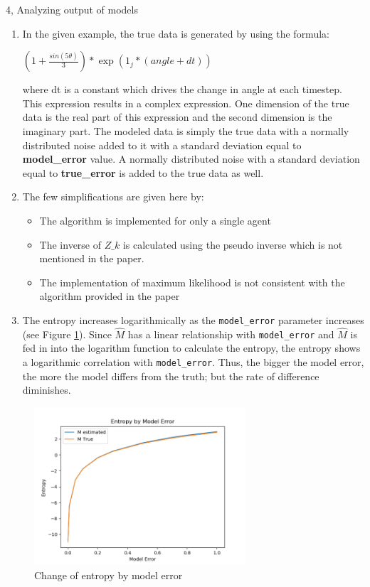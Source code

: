 \documentclass[10pt,a4paper]{article}
\begin{document}
\begin{task}{4, Analyzing output of models}
\begin{enumerate}
\item In the given example, the true data is generated by using the formula:

\begin{center}
$(1 + \frac{sin(5\theta)}{3}) * \exp(1_j * (angle + dt))$
\end{center}

where dt is a constant which drives the change in angle at each timestep. This expression results in a complex expression. One dimension of the true data is the real part of this expression and the second dimension is the imaginary part. The modeled data is simply the true data with a normally distributed noise added to it with a standard deviation equal to \textbf{model\_error} value. A normally distributed noise with a standard deviation equal to \textbf{true\_error} is added to the true data as well.
\item The few simplifications are given here by:
	\begin{itemize}
		\item The algorithm is implemented for only a single agent
		\item The inverse of $Z\_k$ is calculated using the pseudo inverse which is not mentioned in the paper.
		\item The implementation of maximum likelihood is not consistent with the algorithm provided in the paper
	\end{itemize}
\item The entropy increases logarithmically as the \texttt{model\_error} parameter increases (see Figure \ref{fig:entropy_change_task4}). Since $\hat{M}$ has a linear relationship with \texttt{model\_error} and $\hat{M}$ is fed in into the logarithm function to calculate the entropy, the entropy shows a logarithmic correlation with \texttt{model\_error}. Thus, the bigger the model error, the more the model differs from the truth; but the rate of difference diminishes. 
\end{enumerate}
\begin{figure}[H]
    \centering
    \includegraphics[width=0.7\textwidth]{pictures/task4/task4_entropy.png}
    \caption{Change of entropy by model error}
    \label{fig:entropy_change_task4}
\end{figure}

\end{task}
\end{document}
